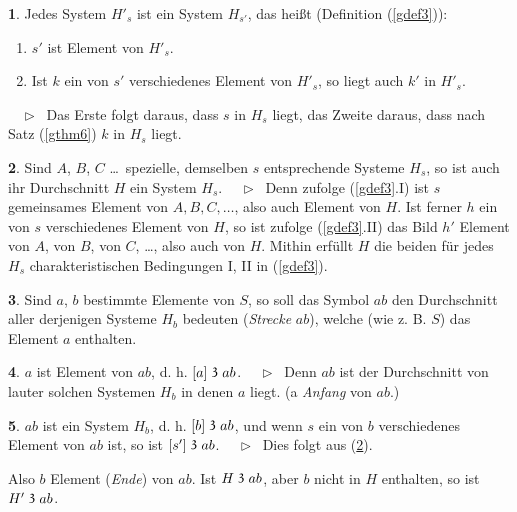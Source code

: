 \documentclass[leqno,hidelinks,a4paper]{article}
\theoremstyle{definition}
\newtheorem{satz}{\protect\satzname}
\newtheorem{deff}[satz]{\protect\deffname}
\newcommand{\satzname}{}
\newcommand{\deffname}{}
\renewcommand{\satzname}{\hspace{-4pt}.\ Satz}%
\renewcommand{\deffname}{\hspace{-4pt}.\ Definition}%
\renewcommand{\satzname}{\hspace{-4pt}.\ Theorem}%
\renewcommand{\deffname}{\hspace{-4pt}.\ Definition}%
\newcommand\Beweis{\medskip \newline $ \phantom{'.'} \rhd \ $}%
\newcommand\beweis{ $ \phantom{'.'} \rhd \ $}%
\newcommand\TeilVon{\mathrel{\raisebox{0.45ex}{$\mathfrak{3}$}}}
\begin{document}
\begin{paracol}{2}
\begin{satz}\label{gthm7}
Jedes System $H'_s$ ist ein System $H_{s'}$, das heißt (Definition (\ref{gdef3})):
\begin{enumerate}[I'.]
    \item $s'$ ist Element von $H'_s$.
    \item Ist $k$ ein von $s'$ verschiedenes Element von $H'_s$, so liegt auch $k'$ in $H'_s$.
\end{enumerate}
\beweis
Das Erste folgt daraus, dass $s$ in $H_s$ liegt, das Zweite daraus,
dass nach Satz (\ref{gthm6}) $k$ in $H_s$ liegt.
\end{satz}

\begin{satz}\label{gthm8}
Sind $A$, $B$, $C$ \ldots\ spezielle, demselben $s$ entsprechende Systeme $H_s$,
so ist auch ihr Durchschnitt $H$ ein System $H_s$.
\Beweis
Denn zufolge (\ref{gdef3}.I) ist $s$ gemeinsames Element von $A, B, C, \ldots$,
also auch Element von $H$. Ist ferner $h$ ein von $s$ verschiedenes Element von
$H$, so ist zufolge (\ref{gdef3}.II) das Bild $h'$ Element von $A$, von $B$, von
$C$, \ldots, also auch von $H$. Mithin erfüllt $H$ die beiden für jedes $H_s$
charakteristischen Bedingungen I, II in (\ref{gdef3}).
\end{satz}

\begin{deff}\label{gdef9}
Sind $a$, $b$ bestimmte Elemente von $S$, so soll das Symbol $ab$ den Durchschnitt
aller derjenigen Systeme $H_b$ bedeuten (\emph{Strecke} $ab$), welche (wie z. B. $S$)
das Element $a$ enthalten.
\end{deff}

\newpage

\begin{satz}\label{gthm10}
$a$ ist Element von $ab$, d. h. $[a] \TeilVon ab$.
\Beweis
Denn $ab$ ist der Durchschnitt von lauter solchen Systemen $H_b$ in denen $a$
liegt. (a \emph{Anfang} von $ab$.)
\end{satz}

\begin{satz}\label{gthm11}
$ab$ ist ein System $H_b$, d. h. $[b] \TeilVon ab$, und wenn $s$ ein von $b$
verschiedenes Element von $ab$ ist, so ist $[s'] \TeilVon ab$.
\Beweis
Dies folgt aus (\ref{gthm8}).
\end{satz}

Also $b$ Element (\emph{Ende}) von $ab$. Ist $H \TeilVon ab$, aber $b$ nicht in
$H$ enthalten, so ist $H' \TeilVon ab$.


\end{paracol}
\end{document}
